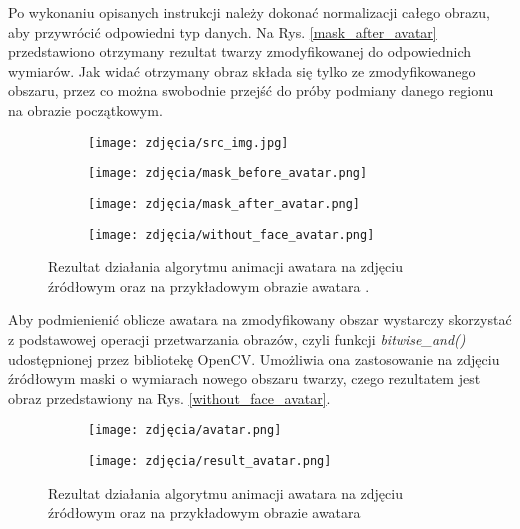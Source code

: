 Po wykonaniu opisanych instrukcji należy dokonać normalizacji całego obrazu, aby przywrócić odpowiedni typ danych. Na Rys. \ref{mask_after_avatar} przedstawiono otrzymany rezultat twarzy zmodyfikowanej do odpowiednich wymiarów. Jak widać otrzymany obraz składa się tylko ze zmodyfikowanego obszaru, przez co można swobodnie przejść do próby podmiany danego regionu na obrazie początkowym.

\begin{figure}[h]
	\centering
	\begin{subfigure}{0.35\textwidth}
		\centering
		\texttt{[image: zdjęcia/src\_img.jpg]}
		\subcaption{\label{src_img}}
	\end{subfigure}
	\begin{subfigure}{0.35\textwidth}
		\centering
		\texttt{[image: zdjęcia/mask\_before\_avatar.png]}
		\subcaption{\label{mask_before_avatar}}
	\end{subfigure}
	\begin{subfigure}{0.35\textwidth}
		\centering
		\texttt{[image: zdjęcia/mask\_after\_avatar.png]}
		\subcaption{\label{mask_after_avatar}}
	\end{subfigure}
	\begin{subfigure}{0.35\textwidth}
		\centering
		\texttt{[image: zdjęcia/without\_face\_avatar.png]}
		\subcaption{\label{without_face_avatar}}
	\end{subfigure}
	
	\caption{\label{fig:result}Rezultat działania algorytmu animacji awatara \protect{} na zdjęciu źródłowym \protect{} oraz na przykładowym obrazie awatara \protect{}.}
\end{figure}

Aby podmienienić oblicze awatara na zmodyfikowany obszar wystarczy skorzystać z podstawowej operacji przetwarzania obrazów, czyli funkcji \textit{bitwise\_and()} udostępnionej przez bibliotekę OpenCV. Umożliwia ona zastosowanie na zdjęciu źródłowym maski o wymiarach nowego obszaru twarzy, czego rezultatem jest obraz przedstawiony na Rys. \ref{without_face_avatar}.

\begin{figure}[h]
	\centering
	\begin{subfigure}{0.35\textwidth}
		\centering
		\texttt{[image: zdjęcia/avatar.png]}
		\subcaption{\label{avatar}}
	\end{subfigure}
	\begin{subfigure}{0.35\textwidth}
		\centering
		\texttt{[image: zdjęcia/result\_avatar.png]}
		\subcaption{\label{result_avatar}}
	\end{subfigure}
	
	\caption{\label{fig:result}Rezultat działania algorytmu animacji awatara \protect{} na zdjęciu źródłowym \protect{} oraz na przykładowym obrazie awatara \protect{}}
\end{figure}

